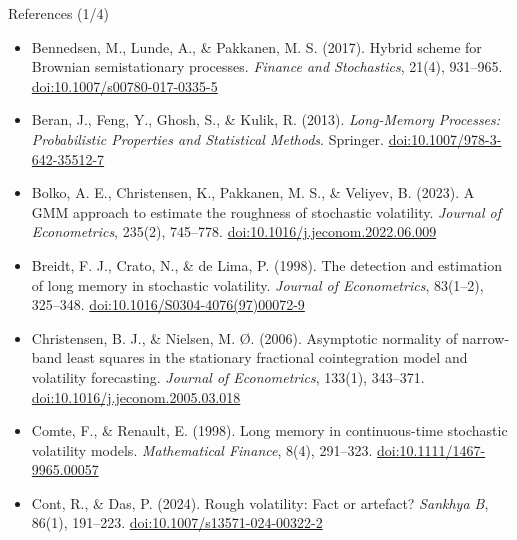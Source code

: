 \begin{frame}{References (1/4)}
\begin{itemize}
    \item Bennedsen, M., Lunde, A., \& Pakkanen, M. S. (2017). Hybrid scheme for Brownian semistationary processes. \textit{Finance and Stochastics}, 21(4), 931--965. \href{https://doi.org/10.1007/s00780-017-0335-5}{doi:10.1007/s00780-017-0335-5}
    \item Beran, J., Feng, Y., Ghosh, S., \& Kulik, R. (2013). \textit{Long-Memory Processes: Probabilistic Properties and Statistical Methods}. Springer. \href{https://doi.org/10.1007/978-3-642-35512-7}{doi:10.1007/978-3-642-35512-7}
    \item Bolko, A. E., Christensen, K., Pakkanen, M. S., \& Veliyev, B. (2023). A GMM approach to estimate the roughness of stochastic volatility. \textit{Journal of Econometrics}, 235(2), 745--778. \href{https://doi.org/10.1016/j.jeconom.2022.06.009}{doi:10.1016/j.jeconom.2022.06.009}
    \item Breidt, F. J., Crato, N., \& de Lima, P. (1998). The detection and estimation of long memory in stochastic volatility. \textit{Journal of Econometrics}, 83(1--2), 325--348. \href{https://doi.org/10.1016/S0304-4076(97)00072-9}{doi:10.1016/S0304-4076(97)00072-9}
    \item Christensen, B. J., \& Nielsen, M. Ø. (2006). Asymptotic normality of narrow-band least squares in the stationary fractional cointegration model and volatility forecasting. \textit{Journal of Econometrics}, 133(1), 343--371. \href{https://doi.org/10.1016/j.jeconom.2005.03.018}{doi:10.1016/j.jeconom.2005.03.018}
    \item Comte, F., \& Renault, E. (1998). Long memory in continuous-time stochastic volatility models. \textit{Mathematical Finance}, 8(4), 291--323. \href{https://doi.org/10.1111/1467-9965.00057}{doi:10.1111/1467-9965.00057}
    \item Cont, R., \& Das, P. (2024). Rough volatility: Fact or artefact? \textit{Sankhya B}, 86(1), 191--223. \href{https://doi.org/10.1007/s13571-024-00322-2}{doi:10.1007/s13571-024-00322-2}
\end{itemize}
\end{frame}

